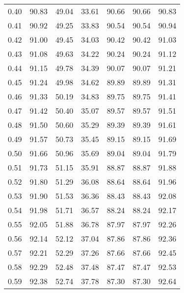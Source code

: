 \begin{tabular}{|c|c|c|c|c|c|c|}
      0.40 &     90.83 &     49.04 &      33.61 &   90.66 &      90.66 &         90.83 \\
      0.41 &     90.92 &     49.25 &      33.83 &   90.54 &      90.54 &         90.94 \\
      0.42 &     91.00 &     49.45 &      34.03 &   90.42 &      90.42 &         91.03 \\
      0.43 &     91.08 &     49.63 &      34.22 &   90.24 &      90.24 &         91.12 \\
      0.44 &     91.15 &     49.78 &      34.39 &   90.07 &      90.07 &         91.21 \\
      0.45 &     91.24 &     49.98 &      34.62 &   89.89 &      89.89 &         91.31 \\
      0.46 &     91.33 &     50.19 &      34.83 &   89.75 &      89.75 &         91.41 \\
      0.47 &     91.42 &     50.40 &      35.07 &   89.57 &      89.57 &         91.51 \\
      0.48 &     91.50 &     50.60 &      35.29 &   89.39 &      89.39 &         91.61 \\
      0.49 &     91.57 &     50.73 &      35.45 &   89.15 &      89.15 &         91.69 \\
      0.50 &     91.66 &     50.96 &      35.69 &   89.04 &      89.04 &         91.79 \\
      0.51 &     91.73 &     51.15 &      35.91 &   88.87 &      88.87 &         91.88 \\
      0.52 &     91.80 &     51.29 &      36.08 &   88.64 &      88.64 &         91.96 \\
      0.53 &     91.90 &     51.53 &      36.36 &   88.43 &      88.43 &         92.08 \\
      0.54 &     91.98 &     51.71 &      36.57 &   88.24 &      88.24 &         92.17 \\
      0.55 &     92.05 &     51.88 &      36.78 &   87.97 &      87.97 &         92.26 \\
      0.56 &     92.14 &     52.12 &      37.04 &   87.86 &      87.86 &         92.36 \\
      0.57 &     92.21 &     52.29 &      37.26 &   87.66 &      87.66 &         92.45 \\
      0.58 &     92.29 &     52.48 &      37.48 &   87.47 &      87.47 &         92.53 \\
      0.59 &     92.38 &     52.74 &      37.78 &   87.30 &      87.30 &         92.64 \\

\end{tabular}
